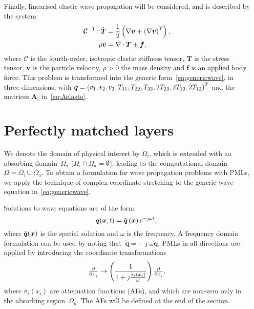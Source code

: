 \documentclass[a4paper]{article}
\renewcommand{\vec}{\boldsymbol}
\begin{document}
Finally, linearised elastic wave propagation will be considered, and
is described by the system
\begin{equation}
  \begin{aligned}
    \vec{\mathcal{C}}^{-1} : \Dot{\vec{T}}
    &= \frac{1}{2}\del{\nabla\vec{v} + \del{\nabla\vec{v}}^T},
    \\
    \rho \Dot{\vec{v}} &= \nabla \cdot \vec{T}+ \vec{f},
  \end{aligned}
  \label{eq:esyst}
\end{equation}
where $\vec{\mathcal{C}}$ is the fourth-order, isotropic elastic
stiffness tensor, $\vec{T}$ is the stress tensor, $\vec{v}$ is the
particle velocity, $\rho > 0$ the mass density and $\vec{f}$ is an
applied body force. This problem is transformed into the generic
form~\eqref{eq:genericwave}, in three dimensions, with $\vec{q} =
\del{v_1, v_2, v_3, T_{11}, T_{22}, T_{33}, 2T_{23}, 2T_{13},
  2T_{12}}^T$ and the matrices $\vec{A}_i$ in~\eqref{eq:Aelasto}.

\section{Perfectly matched layers}
\label{sec:pml}

We denote the domain of physical interest by $\Omega_i$, which is
extended with an absorbing domain~$\Omega_a$ ($\Omega_i \cap \Omega_a
= \emptyset$), leading to the computational domain~$\Omega =
\Omega_i \cup \Omega_a$.  To obtain a formulation for wave propagation
problems with PMLs, we apply the technique of complex coordinate
stretching \citep{chew94weedon, teixeira00chew} to the generic wave
equation in~\eqref{eq:genericwave}.

Solutions to wave equations are of the form
\begin{equation}
  \vec{q}(\vec{x},t) = \Bar{\vec{q}}\del{\vec{x}}e^{-\jmath \omega t},
  \\
  \label{eq:fd}
\end{equation}
where $\Bar{\vec{q}}(\vec{x})$ is the spatial solution and $\omega$ is
the frequency. A frequency domain formulation can be used by noting
that~$\Dot{\vec{q}} = -\jmath \omega \vec{q}$. PMLs in all directions
are applied by introducing the coordinate transformations
\begin{equation}
  \pd{}{x_i}
  \rightarrow
  \del{\frac{1}{1+\jmath\frac{\sigma_i(x_i)}{\omega}}}
  \pd{}{x_i},
  \label{eq:pml3d}
\end{equation}
where $\sigma_i(x_i)$ are attenuation functions (AFs), and which are
non-zero only in the absorbing region~$\Omega_a$. The AFs will be
defined at the end of the section.
\end{document}
